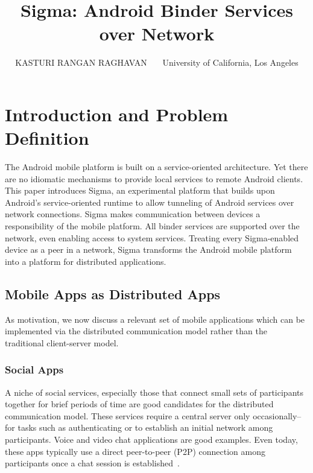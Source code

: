 \documentclass[prodmode]{acmlarge}
\title{Sigma: Android Binder Services over Network}
\author{KASTURI RANGAN RAGHAVAN~~~
University of California, Los Angeles
}
\begin{document}
\pagestyle{plain}
\maketitle
\tableofcontents

\clearpage
\section{Introduction and Problem Definition}

The Android mobile platform is built on a service-oriented architecture. Yet there are no idiomatic mechanisms to provide local services to remote Android clients. This paper introduces Sigma, an experimental platform that builds upon Android's service-oriented runtime to allow tunneling of Android services over network connections. Sigma makes communication between devices a responsibility of the mobile platform. All binder services are supported over the network, even enabling access to system services. Treating every Sigma-enabled device as a peer in a network, Sigma transforms the Android mobile platform into a platform for distributed applications.

\subsection{Mobile Apps as Distributed Apps}
As motivation, we now discuss a relevant set of mobile applications which can be implemented via the distributed communication model rather than the traditional client-server model.

\subsubsection{Social Apps}
A niche of social services, especially those that connect small sets of participants together for brief periods of time are good candidates for the distributed communication model. These services require a central server only occasionally--for tasks such as authenticating or to establish an initial network among participants. Voice and video chat applications are good examples. Even today, these apps typically use a direct peer-to-peer (P2P) connection among participants once a chat session is established~\cite{SkypeStudy,GoogleTalkLibrary}.
\end{document}
